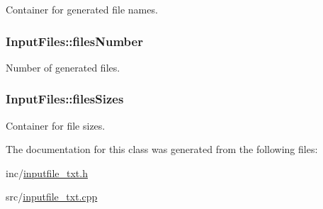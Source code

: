 Container for generated file names. 

\hypertarget{class_input_files_a9614705947e6240bc2daa8cf3db42310}{}
\subsubsection[{files\+Number}]{\setlength{\rightskip}{0pt plus 5cm}Input\+Files\+::files\+Number\hspace{0.3cm}{\ttfamily [private]}}\label{class_input_files_a9614705947e6240bc2daa8cf3db42310}


Number of generated files. 

\hypertarget{class_input_files_a2d6426414a58ca39751e3b26135341e0}{}
\subsubsection[{files\+Sizes}]{\setlength{\rightskip}{0pt plus 5cm}Input\+Files\+::files\+Sizes\hspace{0.3cm}{\ttfamily [private]}}\label{class_input_files_a2d6426414a58ca39751e3b26135341e0}


Container for file sizes. 



The documentation for this class was generated from the following files\+:\begin{DoxyCompactItemize}
\item 
inc/\hyperlink{inputfile__txt_8h}{inputfile\+\_\+txt.\+h}\item 
src/\hyperlink{inputfile__txt_8cpp}{inputfile\+\_\+txt.\+cpp}\end{DoxyCompactItemize}
